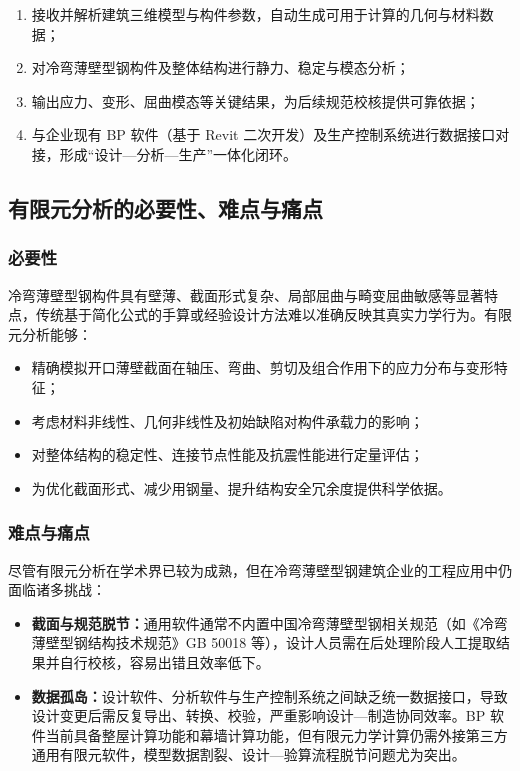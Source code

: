 \begin{enumerate}[label=\arabic*., leftmargin=2em]
    \item 接收并解析建筑三维模型与构件参数，自动生成可用于计算的几何与材料数据；
    \item 对冷弯薄壁型钢构件及整体结构进行静力、稳定与模态分析；
    \item 输出应力、变形、屈曲模态等关键结果，为后续规范校核提供可靠依据；
    \item 与企业现有 BP 软件（基于 Revit 二次开发）及生产控制系统进行数据接口对接，形成“设计—分析—生产”一体化闭环。
\end{enumerate}

\subsection{有限元分析的必要性、难点与痛点}

\subsubsection{必要性}
冷弯薄壁型钢构件具有壁薄、截面形式复杂、局部屈曲与畸变屈曲敏感等显著特点，传统基于简化公式的手算或经验设计方法难以准确反映其真实力学行为。有限元分析能够：

\begin{itemize}[leftmargin=2em]
    \item 精确模拟开口薄壁截面在轴压、弯曲、剪切及组合作用下的应力分布与变形特征；
    \item 考虑材料非线性、几何非线性及初始缺陷对构件承载力的影响；
    \item 对整体结构的稳定性、连接节点性能及抗震性能进行定量评估；
    \item 为优化截面形式、减少用钢量、提升结构安全冗余度提供科学依据。
\end{itemize}

\subsubsection{难点与痛点}
尽管有限元分析在学术界已较为成熟，但在冷弯薄壁型钢建筑企业的工程应用中仍面临诸多挑战：

\begin{itemize}[leftmargin=2em]
    \item \textbf{截面与规范脱节：}通用软件通常不内置中国冷弯薄壁型钢相关规范（如《冷弯薄壁型钢结构技术规范》GB 50018\cite{GB50018} 等），设计人员需在后处理阶段人工提取结果并自行校核，容易出错且效率低下。
    \item \textbf{数据孤岛：}设计软件、分析软件与生产控制系统之间缺乏统一数据接口，导致设计变更后需反复导出、转换、校验，严重影响设计—制造协同效率。BP 软件当前具备整屋计算功能和幕墙计算功能，但有限元力学计算仍需外接第三方通用有限元软件，模型数据割裂、设计—验算流程脱节问题尤为突出。
\end{itemize}

